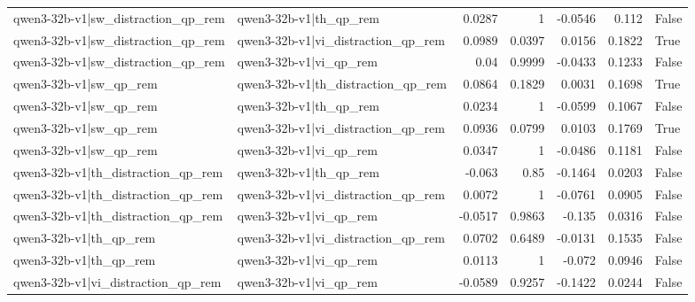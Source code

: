 \begin{table}
\begin{tabular}{l l r r r r l}
qwen3-32b-v1|sw_distraction_qp_rem & qwen3-32b-v1|th_qp_rem & 0.0287 & 1 & -0.0546 & 0.112 & False \\
qwen3-32b-v1|sw_distraction_qp_rem & qwen3-32b-v1|vi_distraction_qp_rem & 0.0989 & 0.0397 & 0.0156 & 0.1822 & True \\
qwen3-32b-v1|sw_distraction_qp_rem & qwen3-32b-v1|vi_qp_rem & 0.04 & 0.9999 & -0.0433 & 0.1233 & False \\
qwen3-32b-v1|sw_qp_rem & qwen3-32b-v1|th_distraction_qp_rem & 0.0864 & 0.1829 & 0.0031 & 0.1698 & True \\
qwen3-32b-v1|sw_qp_rem & qwen3-32b-v1|th_qp_rem & 0.0234 & 1 & -0.0599 & 0.1067 & False \\
qwen3-32b-v1|sw_qp_rem & qwen3-32b-v1|vi_distraction_qp_rem & 0.0936 & 0.0799 & 0.0103 & 0.1769 & True \\
qwen3-32b-v1|sw_qp_rem & qwen3-32b-v1|vi_qp_rem & 0.0347 & 1 & -0.0486 & 0.1181 & False \\
qwen3-32b-v1|th_distraction_qp_rem & qwen3-32b-v1|th_qp_rem & -0.063 & 0.85 & -0.1464 & 0.0203 & False \\
qwen3-32b-v1|th_distraction_qp_rem & qwen3-32b-v1|vi_distraction_qp_rem & 0.0072 & 1 & -0.0761 & 0.0905 & False \\
qwen3-32b-v1|th_distraction_qp_rem & qwen3-32b-v1|vi_qp_rem & -0.0517 & 0.9863 & -0.135 & 0.0316 & False \\
qwen3-32b-v1|th_qp_rem & qwen3-32b-v1|vi_distraction_qp_rem & 0.0702 & 0.6489 & -0.0131 & 0.1535 & False \\
qwen3-32b-v1|th_qp_rem & qwen3-32b-v1|vi_qp_rem & 0.0113 & 1 & -0.072 & 0.0946 & False \\
qwen3-32b-v1|vi_distraction_qp_rem & qwen3-32b-v1|vi_qp_rem & -0.0589 & 0.9257 & -0.1422 & 0.0244 & False \\
\bottomrule
\end{tabular}
\end{table}

